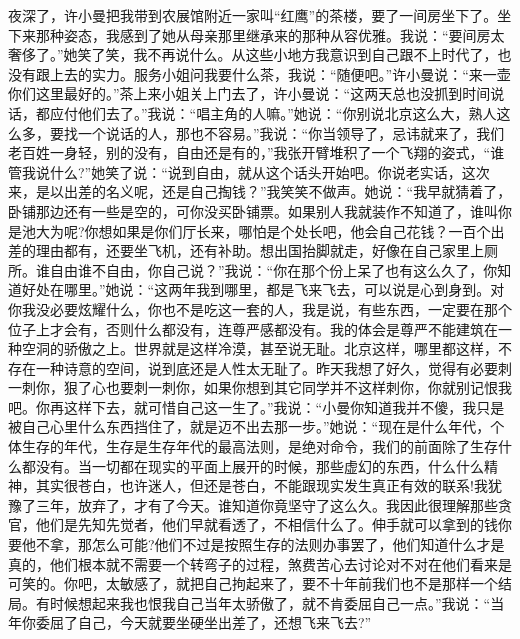 \documentclass[12pt,oneside]{book}
\begin{document}
夜深了，许小曼把我带到农展馆附近一家叫``红鹰''的茶楼，要了一间房坐下了。坐下来那种姿态，我感到了她从母亲那里继承来的那种从容优雅。我说：``要间房太奢侈了。''她笑了笑，我不再说什么。从这些小地方我意识到自己跟不上时代了，也没有跟上去的实力。服务小姐问我要什么茶，我说：``随便吧。''许小曼说：``来一壶你们这里最好的。''茶上来小姐关上门去了，许小曼说：``这两天总也没抓到时间说话，都应付他们去了。''我说：``唱主角的人嘛。''她说：``你别说北京这么大，熟人这么多，要找一个说话的人，那也不容易。''我说：``你当领导了，忌讳就来了，我们老百姓一身轻，别的没有，自由还是有的，''我张开臂堆积了一个飞翔的姿式，``谁管我说什么?''她笑了说：``说到自由，就从这个话头开始吧。你说老实话，这次来，是以出差的名义呢，还是自己掏钱？''我笑笑不做声。她说：``我早就猜着了，卧铺那边还有一些是空的，可你没买卧铺票。如果别人我就装作不知道了，谁叫你是池大为呢?你想如果是你们厅长来，哪怕是个处长吧，他会自己花钱？一百个出差的理由都有，还要坐飞机，还有补助。想出国抬脚就走，好像在自己家里上厕所。谁自由谁不自由，你自己说？''我说：``你在那个份上呆了也有这么久了，你知道好处在哪里。''她说：``这两年我到哪里，都是飞来飞去，可以说是心到身到。对你我没必要炫耀什么，你也不是吃这一套的人，我是说，有些东西，一定要在那个位子上才会有，否则什么都没有，连尊严感都没有。我的体会是尊严不能建筑在一种空洞的骄傲之上。世界就是这样冷漠，甚至说无耻。北京这样，哪里都这样，不存在一种诗意的空间，说到底还是人性太无耻了。昨天我想了好久，觉得有必要刺一刺你，狠了心也要刺一刺你，如果你想到其它同学并不这样刺你，你就别记恨我吧。你再这样下去，就可惜自己这一生了。''我说：``小曼你知道我并不傻，我只是被自己心里什么东西挡住了，就是迈不出去那一步。''她说：``现在是什么年代，个体生存的年代，生存是生存年代的最高法则，是绝对命令，我们的前面除了生存什么都没有。当一切都在现实的平面上展开的时候，那些虚幻的东西，什么什么精神，其实很苍白，也许迷人，但还是苍白，不能跟现实发生真正有效的联系!我犹豫了三年，放弃了，才有了今天。谁知道你竟坚守了这么久。我因此很理解那些贪官，他们是先知先觉者，他们早就看透了，不相信什么了。伸手就可以拿到的钱你要他不拿，那怎么可能?他们不过是按照生存的法则办事罢了，他们知道什么才是真的，他们根本就不需要一个转弯子的过程，煞费苦心去讨论对不对在他们看来是可笑的。你吧，太敏感了，就把自己拘起来了，要不十年前我们也不是那样一个结局。有时候想起来我也恨我自己当年太骄傲了，就不肯委屈自己一点。''我说：``当年你委屈了自己，今天就要坐硬坐出差了，还想飞来飞去?''
\end{document}
